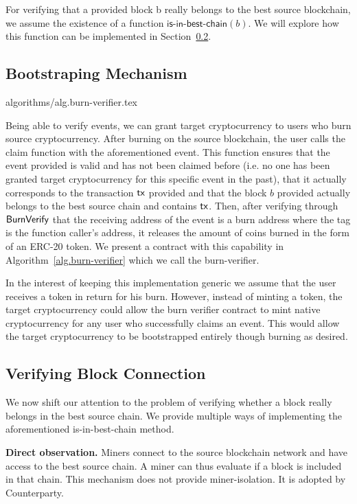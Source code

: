 For verifying that a provided block \textsf{b} really belongs to the best source blockchain, we assume the existence of a function $\textsf{is-in-best-chain}(b)$. We will explore how this function can be implemented in Section~\ref{section:block-connection}.

\subsection{Bootstraping Mechanism}
{algorithms/alg.burn-verifier.tex}

Being able to verify events, we can grant target cryptocurrency to users who burn source cryptocurrency. After burning on the source blockchain, the user calls the \textsf{claim} function with the aforementioned event. This function ensures that the event provided is valid and has not been claimed before (i.e. no one has been granted target cryptocurrency for this specific event in the past), that it actually corresponds to the transaction $\textsf{tx}$ provided and that the block $b$ provided actually belongs to the best source chain and contains $\textsf{tx}$. Then, after verifying through $\mathsf{BurnVerify}$ that the receiving address of the event is a burn address where the tag is the function caller's address, it releases the amount of coins burned in the form of an ERC-20 token. We present a contract with this capability in Algorithm~\ref{alg.burn-verifier} which we call the \textsf{burn-verifier}.

In the interest of keeping this implementation generic we assume that the user receives a token in return for his burn. However, instead of minting a token, the target cryptocurrency could allow the burn verifier contract to mint native cryptocurrency for any user who successfully claims an event. This would allow the target cryptocurrency to be bootstrapped entirely though burning as desired.

\subsection{Verifying Block Connection}\label{section:block-connection}
We now shift our attention to the problem of verifying whether a block really belongs in the best source chain. We provide multiple ways of implementing the aforementioned \textsf{is-in-best-chain} method.

\noindent
\textbf{Direct observation.}
Miners connect to the source blockchain network and have access to the best source chain. A miner can thus evaluate if a block is included in that chain. This mechanism does not provide miner-isolation. It is adopted by Counterparty.

